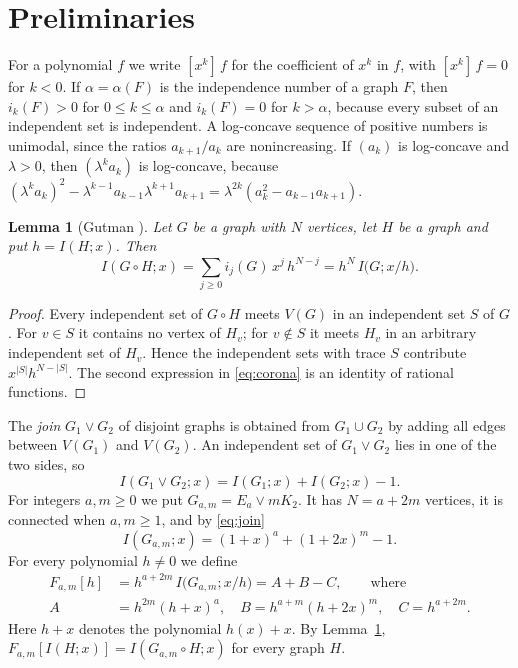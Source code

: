 \documentclass[11pt]{amsart}
\newtheorem{lemma}[theorem]{Lemma}
\theoremstyle{remark}
\numberwithin{equation}{section}
\newcommand{\cor}{\circ}
\newcommand{\coef}[2]{[x^{#1}]\,#2}
\newcommand{\Gam}{G_{a,m}}
\begin{document}
\section{Preliminaries}\label{sec:prelim}

For a polynomial $f$ we write $\coef{k}{f}$ for the coefficient of $x^k$ in $f$, with $\coef{k}{f}=0$ for $k<0$. If $\alpha=\alpha(F)$ is the independence number of a graph $F$, then $i_k(F)>0$ for $0\le k\le\alpha$ and $i_k(F)=0$ for $k>\alpha$, because every subset of an independent set is independent. A log-concave sequence of positive numbers is unimodal, since the ratios $a_{k+1}/a_k$ are nonincreasing. If $(a_k)$ is log-concave and $\lambda>0$, then $(\lambda^ka_k)$ is log-concave, because $(\lambda^ka_k)^2-\lambda^{k-1}a_{k-1}\lambda^{k+1}a_{k+1}=\lambda^{2k}(a_k^2-a_{k-1}a_{k+1})$.

\begin{lemma}[Gutman \cite{Gut92}]\label{lem:corona}
Let $G$ be a graph with $N$ vertices, let $H$ be a graph and put $h=I(H;x)$. Then
\begin{equation}\label{eq:corona}
I(G\cor H;x)=\sum_{j\ge 0} i_j(G)\,x^j\,h^{N-j}=h^N\,I\bigl(G;x/h\bigr).
\end{equation}
\end{lemma}

\begin{proof}
Every independent set of $G\cor H$ meets $V(G)$ in an independent set $S$ of $G$. For $v\in S$ it contains no vertex of $H_v$; for $v\notin S$ it meets $H_v$ in an arbitrary independent set of $H_v$. Hence the independent sets with trace $S$ contribute $x^{|S|}h^{N-|S|}$. The second expression in \eqref{eq:corona} is an identity of rational functions.
\end{proof}

The \emph{join} $G_1\vee G_2$ of disjoint graphs is obtained from $G_1\cup G_2$ by adding all edges between $V(G_1)$ and $V(G_2)$. An independent set of $G_1\vee G_2$ lies in one of the two sides, so
\begin{equation}\label{eq:join}
I(G_1\vee G_2;x)=I(G_1;x)+I(G_2;x)-1 .
\end{equation}
For integers $a,m\ge 0$ we put $\Gam=E_a\vee mK_2$. It has $N=a+2m$ vertices, it is connected when $a,m\ge 1$, and by \eqref{eq:join}
\[
I(\Gam;x)=(1+x)^a+(1+2x)^m-1 .
\]
For every polynomial $h\ne 0$ we define
\begin{equation}\label{eq:Fm}
\begin{aligned}
F_{a,m}[h]&=h^{a+2m}\,I\bigl(\Gam;x/h\bigr)=A+B-C,\qquad\text{where}\\
A&=h^{2m}(h+x)^{a},\quad B=h^{a+m}(h+2x)^{m},\quad C=h^{a+2m}.
\end{aligned}
\end{equation}
Here $h+x$ denotes the polynomial $h(x)+x$. By Lemma~\ref{lem:corona}, $F_{a,m}[I(H;x)]=I(\Gam\cor H;x)$ for every graph $H$.
\end{document}
